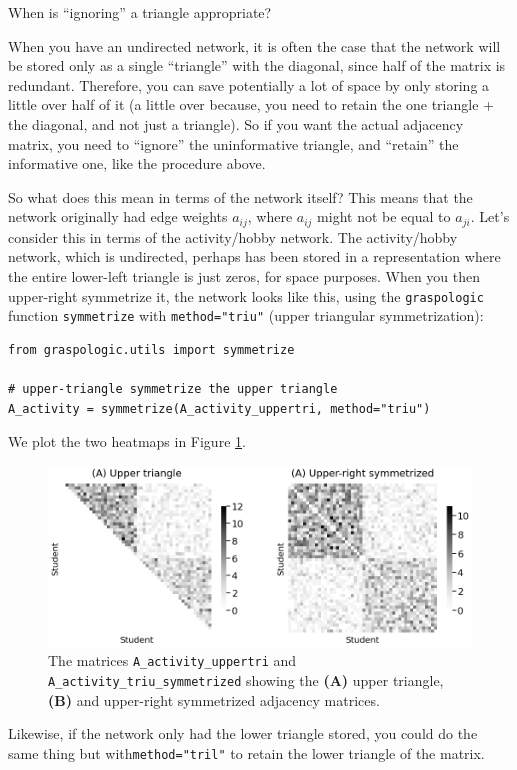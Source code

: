 \begin{floatingbox}[h]
\caption{When is ``ignoring'' a triangle appropriate?}

When you have an undirected network, it is often the case that the network will be stored only as a single ``triangle'' with the diagonal, since half of the matrix is redundant. Therefore, you can save potentially a lot of space by only storing a little over half of it (a little over because, you need to retain the one triangle + the diagonal, and not just a triangle). So if you want the actual adjacency matrix, you need to ``ignore'' the uninformative triangle, and ``retain'' the informative one, like the procedure above.
\end{floatingbox}


So what does this mean in terms of the network itself? This means that the network originally had edge weights $a_{ij}$, where $a_{ij}$ might not be equal to $a_{ji}$. Let's consider this in terms of the activity/hobby network. The activity/hobby network, which is undirected, perhaps has been stored in a representation where the entire lower-left triangle is just zeros, for space purposes. When you then upper-right symmetrize it, the network looks like this, using the \texttt{graspologic} function \texttt{symmetrize} with \texttt{method="triu"} (upper triangular symmetrization):


\begin{lstlisting}[style=python]
from graspologic.utils import symmetrize

# upper-triangle symmetrize the upper triangle
A_activity = symmetrize(A_activity_uppertri, method="triu")
\end{lstlisting}
We plot the two heatmaps in Figure \ref{fig:ch4:triusym}.

\begin{figure}[h]
    \centering
    \includegraphics[width=\linewidth]{representations/ch4/Images/triusym.png}
    \caption[Symmetrization through discarding a triangle]{The matrices \texttt{A\_activity\_uppertri} and \texttt{A\_activity\_triu\_symmetrized} showing the \textbf{(A)} upper triangle, \textbf{(B)} and upper-right symmetrized adjacency matrices.}
    \label{fig:ch4:triusym}
\end{figure}
Likewise, if the network only had the lower triangle stored, you could do the same thing but with\texttt{method="tril"} to retain the lower triangle of the matrix.

